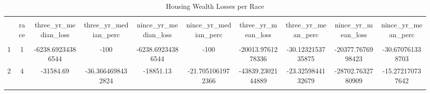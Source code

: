 
\begin{table}[!htbp] \centering 
  \caption{Housing Wealth Losses per Race} 
  \label{} 
\begin{tabular}{@{\extracolsep{5pt}} cccccccccc} 
\\[-1.8ex]\hline 
\hline \\[-1.8ex] 
 & race & three\_yr\_median\_loss & three\_yr\_median\_perc & nince\_yr\_median\_loss & nince\_yr\_median\_perc & three\_yr\_mean\_loss & three\_yr\_mean\_perc & nince\_yr\_mean\_loss & nince\_yr\_mean\_perc \\ 
\hline \\[-1.8ex] 
1 & 1 & -6238.69234386544 & -100 & -6238.69234386544 & -100 & -20013.9761278336 & -30.1232153735875 & -20377.7676998423 & -30.670761338703 \\ 
2 & 4 & -31584.69 & -36.3664698432824 & -18851.13 & -21.7051061972366 & -43839.2302144889 & -23.3259844132679 & -28702.7632780909 & -15.272170737642 \\ 
\hline \\[-1.8ex] 
\end{tabular} 
\end{table} 
